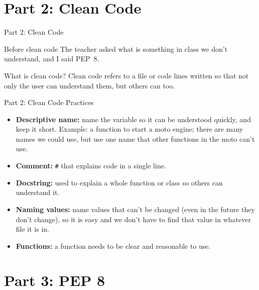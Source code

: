 \documentclass[aspectratio=169,11pt]{beamer}
\begin{document}
\section{Part 2: Clean Code}

\begin{frame}{Part 2: Clean Code}
  \begin{alertblock}{Before clean code}
    The teacher asked what is something in class we don't understand, and I said
    PEP~8.
  \end{alertblock}
  \begin{block}{What is clean code?}
    Clean code refers to a file or code lines written so that not only the user
    can understand them, but others can too.
  \end{block}
\end{frame}

\begin{frame}{Part 2: Clean Code Practices}
  \begin{itemize}\setlength\itemsep{6pt}
    \item[10.] \textbf{Descriptive name:} name the variable so it can be
      understood quickly, and keep it short. Example: a function to start a moto
      engine; there are many names we could use, but use one name that other
      functions in the moto can't use.
    \item[11.] \textbf{Comment:} \texttt{\#} that explains code in a single line.
    \item[12.] \textbf{Docstring:} used to explain a whole function or class so
      others can understand it.
    \item[13.] \textbf{Naming values:} name values that can't be changed (even in
      the future they don't change), so it is easy and we don't have to find that
      value in whatever file it is in.
    \item[14.] \textbf{Functions:} a function needs to be clear and reasonable to
      use.
  \end{itemize}
\end{frame}

\section{Part 3: PEP 8}
\end{document}
